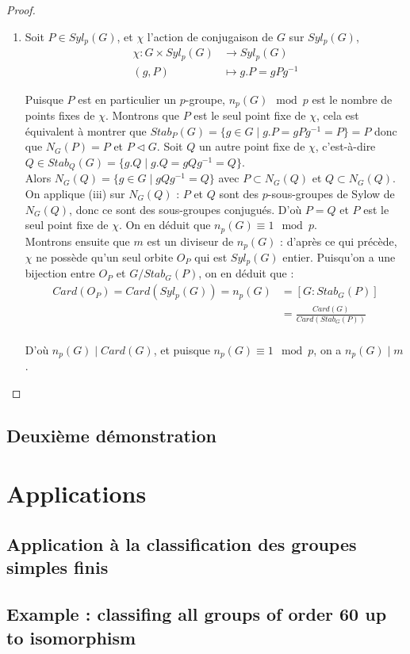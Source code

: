 \documentclass[french]{article}
\theoremstyle{definition}
\theoremstyle{plain}
\theoremstyle{plain}
\theoremstyle{plain}
\theoremstyle{plain}
\theoremstyle{plain}
\begin{document}
\begin{proof}
\begin{enumerate}[label={\upshape(\roman*)}]
\item Soit \( P \in Syl_{p}(G) \), et \( \chi \) l'action de conjugaison de \( G \) sur \( Syl_{p}(G) \),
\begin{align*}
	\chi : G \times Syl_{p}(G) &\to Syl_{p}(G) \\
	(g,P) &\mapsto g.P = gPg^{-1}
\end{align*}

Puisque \( P \) est en particulier un \(p\)-groupe, \( n_p(G) \mod p \) est le nombre de points fixes de \( \chi \). Montrons que \( P \) est le seul point fixe de \( \chi \), cela est équivalent à montrer que \( Stab_P(G) = \{ g \in G \mid g.P = gPg^{-1} = P \} = P \) donc que \( N_G(P) = P \) et \( P \triangleleft G \). Soit \( Q \) un autre point fixe de \( \chi \), c'est-à-dire \(Q \in Stab_Q(G) = \{g.Q \mid g.Q = gQg^{-1} = Q \}  \). \\
Alors \( N_G(Q) = \{ g \in G \mid gQg^{-1} = Q\} \) avec \( P \subset N_G(Q) \) et \( Q \subset N_G(Q) \). \\
On applique (iii) sur \( N_G(Q) \) : \( P \) et \( Q \) sont des \(p\)-sous-groupes de Sylow de \( N_G(Q) \), donc ce sont des sous-groupes conjugués. D'où \( P = Q \) et \( P \) est le seul point fixe de \( \chi \). On en déduit que \( n_p(G) \equiv 1 \mod p \). \\
Montrons ensuite que \( m \) est un diviseur de \( n_p(G) \) : d'après ce qui précède, \( \chi \) ne possède qu'un seul orbite \( O_P \) qui est \( Syl_p({G}) \) entier. Puisqu'on a une bijection entre \( O_P \) et \( G/Stab_G(P) \), on en déduit que :
\begin{align*}
	Card(O_P)= Card(Syl_p(G)) = n_p(G) &= [G : Stab_G(P) ] \\ 
		 &= \frac{Card(G)}{Card(Stab_G(P))}\\
\end{align*}

D'où \( n_p(G) \mid Card(G) \), et puisque \( n_p(G) \equiv 1\mod p \), on a \( n_p(G) \mid m \).
	\end{enumerate}
\end{proof}


\subsection{Deuxième démonstration}


\clearpage
\section{Applications}
\subsection{Application à la classification des groupes simples finis}

\cite{dummit2003abstract}

\subsection{Example : classifing all groups of order 60 up to isomorphism}


\clearpage

\printbibliography
\end{document}
